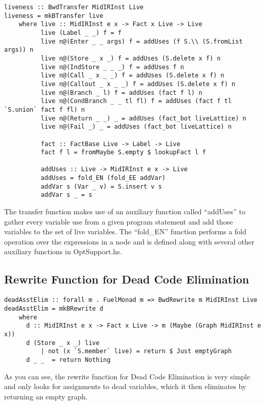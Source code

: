 \documentclass[11pt]{article}
\begin{document}
\begin{verbatim}
liveness :: BwdTransfer MidIRInst Live 
liveness = mkBTransfer live 
    where live :: MidIRInst e x -> Fact x Live -> Live
          live (Label _ _) f = f 
          live n@(Enter _ _ args) f = addUses (f S.\\ (S.fromList args)) n
          live n@(Store _ x _) f = addUses (S.delete x f) n 
          live n@(IndStore _ _ _) f = addUses f n 
          live n@(Call _ x _ _) f = addUses (S.delete x f) n
          live n@(Callout _ x _ _) f = addUses (S.delete x f) n 
          live n@(Branch _ l) f = addUses (fact f l) n 
          live n@(CondBranch _ _ tl fl) f = addUses (fact f tl `S.union` fact f fl) n 
          live n@(Return _ _) _ = addUses (fact_bot liveLattice) n 
          live n@(Fail _) _ = addUses (fact_bot liveLattice) n 

          fact :: FactBase Live -> Label -> Live 
          fact f l = fromMaybe S.empty $ lookupFact l f 

          addUses :: Live -> MidIRInst e x -> Live 
          addUses = fold_EN (fold_EE addVar) 
          addVar s (Var _ v) = S.insert v s 
          addVar s _ = s
\end{verbatim}

The transfer function makes use of an auxiliary function called ``addUses'' to gather every variable use from a given program statement and add those variables to the set of live variables. The ``fold\_EN'' function performs a fold operation over the expressions in a node and is defined along with several other auxiliary functions in OptSupport.hs. 
 
\subsection { Rewrite Function for Dead Code Elimination }

\begin{verbatim}
deadAsstElim :: forall m . FuelMonad m => BwdRewrite m MidIRInst Live 
deadAsstElim = mkBRewrite d 
    where 
      d :: MidIRInst e x -> Fact x Live -> m (Maybe (Graph MidIRInst e x))
      d (Store _ x _) live 
          | not (x `S.member` live) = return $ Just emptyGraph
      d _ _  = return Nothing
\end{verbatim}

As you can see, the rewrite function for Dead Code Elimination is very simple and only looks for assignments to dead variables, which it then eliminates by returning an empty graph. 
\end{document}
